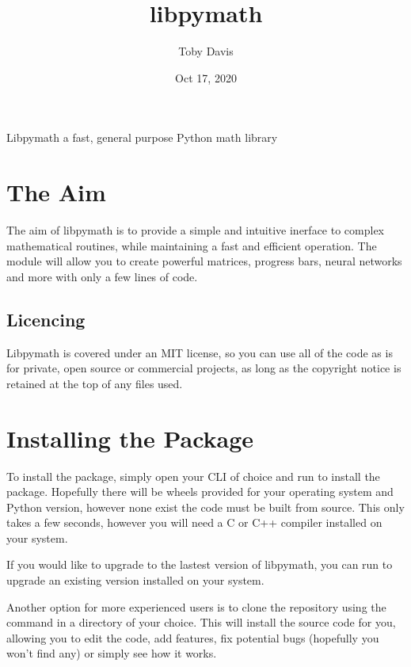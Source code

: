 \documentclass[letterpaper,10pt,english]{sphinxmanual}
\title{libpymath}
\date{Oct 17, 2020}
\author{Toby Davis}
\begin{document}
\pagestyle{empty}
\sphinxmaketitle
\pagestyle{plain}
\sphinxtableofcontents
\pagestyle{normal}
\label{\detokenize{index::doc}}


Libpymath \sphinxhyphen{} a fast, general purpose Python math library


\chapter{The Aim}
\label{\detokenize{index:the-aim}}
The aim of libpymath is to provide a simple and intuitive inerface to complex mathematical routines, while maintaining a fast and efficient operation. The module will allow you to create powerful matrices, progress bars, neural networks and more with only a few lines of code.


\section{Licencing}
\label{\detokenize{index:licencing}}
Libpymath is covered under an MIT license, so you can use all of the code as is for private, open source or commercial projects, as long as the copyright notice is retained at the top of any files used.


\chapter{Installing the Package}
\label{\detokenize{index:installing-the-package}}
To install the package, simply open your CLI of choice and run  to install the package. Hopefully there will be wheels provided for your operating system and Python version, however none exist the code must be built from source. This only takes a few seconds, however you will need a C or C++ compiler installed on your system.

If you would like to upgrade to the lastest version of libpymath, you can run  to upgrade an existing version installed on your system.

Another option for more experienced users is to clone the repository using the  command in a directory of your choice. This will install the source code for you, allowing you to edit the code, add features, fix potential bugs (hopefully you won’t find any) or simply see how it works.
\end{document}
